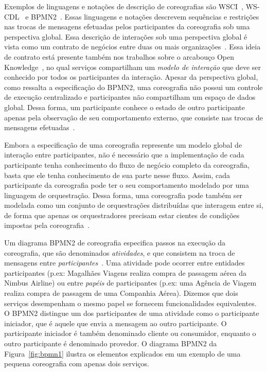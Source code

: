 Exemplos de linguagens e notações de descrição de coreografias são WSCI~\cite{WSCI2002}, WS-CDL~\cite{WSCDL2005} e BPMN2~\cite{BPMN2011}. Essas linguagens e notações descrevem sequências e restrições nas trocas de mensagens efetuadas pelos participantes da coreografia sob uma perspectiva global. Essa descrição de interações sob uma perspectiva global é vista como um contrato de negócios entre duas ou mais organizações~\cite{BPMN2011}. 
Essa ideia de contrato está presente também nos trabalhos sobre o arcabouço Open Knowledge~\cite{Besana2008OpenKnowledge},
no qual serviços compartilham um \emph{modelo de interação} que deve ser conhecido por todos os participantes da interação.
Apesar da perspectiva global, como ressalta a especificação do BPMN2, uma coreografia não possui um controle de execução centralizado e participantes não compartilham um espaço de dados global. Dessa forma, um participante conhece o estado de outro participante apenas pela observação de seu comportamento externo, que consiste nas trocas de mensagens efetuadas~\cite{BPMN2011}.

Embora a especificação de uma coreografia represente um modelo global de interação entre participantes,
não é necessário que a implementação de cada participante tenha conhecimento do fluxo de negócio completo da coreografia,
basta que ele tenha conhecimento de sua parte nesse fluxo.
Assim, cada participante da coreografia pode ter o seu comportamento modelado por uma linguagem de orquestração. Dessa forma, uma coreografia pode também ser modelada como um conjunto de orquestrações distribuídas que interagem entre si, de forma que apenas os orquestradores precisam estar cientes de condições impostas pela coreografia~\cite{Poulin2011Collaboration}. 

Um diagrama BPMN2 de coreografia especifica passos na execução da coreografia, que são denominados \emph{atividades}, e que consistem na troca de mensagens entre \emph{participantes}~\cite{BPMN2011}. Uma atividade pode ocorrer entre entidades participantes (p.ex: Magalhães Viagens realiza compra de passagem aérea da Nimbus Airline) ou entre \emph{papéis} de participantes (p.ex: uma Agência de Viagem realiza compra de passagem de uma Companhia Aérea). Dizemos que dois serviços desempenham o mesmo papel se fornecem funcionalidades equivalentes. O BPMN2 distingue um dos participantes de uma atividade como o participante iniciador, que é aquele que envia a mensagem ao outro participante. O participante iniciador é também denominado cliente ou consumidor, enquanto o outro participante é denominado provedor. O diagrama BPMN2 da Figura~\ref{fig:bpmn1} ilustra os elementos explicados em um exemplo de uma pequena coreografia com apenas dois serviços.

